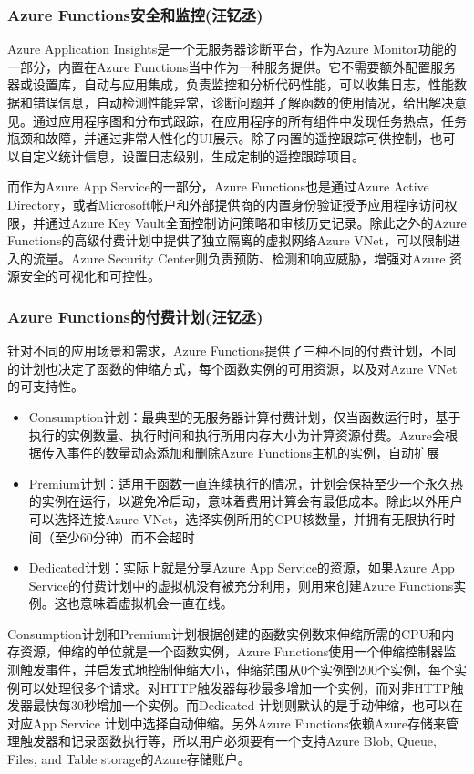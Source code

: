 \documentclass[11pt]{article}
\begin{document}
\subsubsection{Azure Functions安全和监控(汪钇丞)}
Azure Application Insights是一个无服务器诊断平台，作为Azure Monitor功能的一部分，内置在Azure Functions当中作为一种服务提供。它不需要额外配置服务器或设置库，自动与应用集成，负责监控和分析代码性能，可以收集日志，性能数据和错误信息，自动检测性能异常，诊断问题并了解函数的使用情况，给出解决意见。通过应用程序图和分布式跟踪，在应用程序的所有组件中发现任务热点，任务瓶颈和故障，并通过非常人性化的UI展示。除了内置的遥控跟踪可供控制，也可以自定义统计信息，设置日志级别，生成定制的遥控跟踪项目。

而作为Azure App Service的一部分，Azure Functions也是通过Azure Active Directory，或者Microsoft帐户和外部提供商的内置身份验证授予应用程序访问权限，并通过Azure Key Vault全面控制访问策略和审核历史记录。除此之外的Azure Functions的高级付费计划中提供了独立隔离的虚拟网络Azure VNet，可以限制进入的流量。Azure Security Center则负责预防、检测和响应威胁，增强对Azure 资源安全的可视化和可控性。
\subsubsection{Azure Functions的付费计划(汪钇丞)}
针对不同的应用场景和需求，Azure Functions提供了三种不同的付费计划，不同的计划也决定了函数的伸缩方式，每个函数实例的可用资源，以及对Azure VNet的可支持性。
\begin{itemize}
\setlength{\itemsep}{0pt}
\setlength{\parsep}{0pt}
\setlength{\parskip}{0pt}
    \item Consumption计划：最典型的无服务器计算付费计划，仅当函数运行时，基于执行的实例数量、执行时间和执行所用内存大小为计算资源付费。Azure会根据传入事件的数量动态添加和删除Azure Functions主机的实例，自动扩展
    \item Premium计划：适用于函数一直连续执行的情况，计划会保持至少一个永久热的实例在运行，以避免冷启动，意味着费用计算会有最低成本。除此以外用户可以选择连接Azure VNet，选择实例所用的CPU核数量，并拥有无限执行时间（至少60分钟）而不会超时
    \item Dedicated计划：实际上就是分享Azure App Service的资源，如果Azure App Service的付费计划中的虚拟机没有被充分利用，则用来创建Azure Functions实例。这也意味着虚拟机会一直在线。
\end{itemize}
Consumption计划和Premium计划根据创建的函数实例数来伸缩所需的CPU和内存资源，伸缩的单位就是一个函数实例，Azure Functions使用一个伸缩控制器监测触发事件，并启发式地控制伸缩大小，伸缩范围从0个实例到200个实例，每个实例可以处理很多个请求。对HTTP触发器每秒最多增加一个实例，而对非HTTP触发器最快每30秒增加一个实例。而Dedicated 计划则默认的是手动伸缩，也可以在对应App Service 计划中选择自动伸缩。另外Azure Functions依赖Azure存储来管理触发器和记录函数执行等，所以用户必须要有一个支持Azure Blob, Queue, Files, and Table storage的Azure存储账户。
\end{document}
